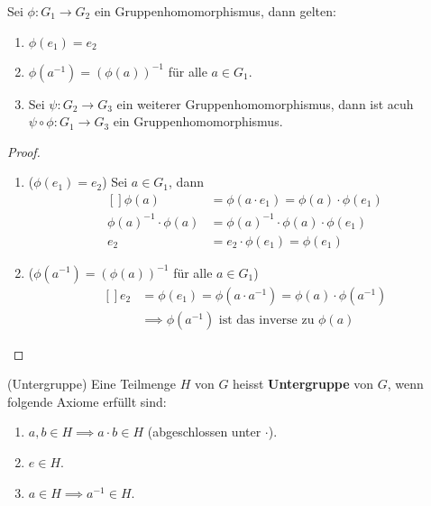 \documentclass[../Algebra_script.tex]{subfiles}
\begin{document}
\begin{proposition}
	Sei $\phi: G_1 \to G_2$ ein Gruppenhomomorphismus, dann gelten:
	\begin{enumerate}
		\item $\phi(e_1) = e_2$
		\item $\phi(a^{-1}) = (\phi(a))^{-1}$ für alle $a \in G_1$.
		\item Sei $\psi: G_2 \to G_3$ ein weiterer Gruppenhomomorphismus, dann ist acuh $\psi \circ \phi: G_1 \to G_3$ ein Gruppenhomomorphismus. 
	\end{enumerate}
\end{proposition}

\begin{proof}
\begin{enumerate}
	\item{($\phi(e_1) = e_2$)} 
		Sei $a \in G_1$, dann 
		\[\begin{aligned}[]
			\phi(a) &= \phi(a\cdot e_1) = \phi(a)\cdot \phi(e_1)\\
			\phi(a)^{-1}\cdot \phi(a) &= \phi(a)^{-1} \cdot \phi(a) \cdot \phi(e_1)\\
			e_2 &= e_2\cdot \phi(e_1) = \phi(e_1)
		\end{aligned}\] 
	\item{($\phi(a^{-1}) = (\phi(a))^{-1}$ für alle $a \in G_1$)}
		\[\begin{aligned}[]
			e_2 &= \phi(e_1) = \phi(a \cdot a^{-1}) = \phi(a)\cdot \phi(a^{-1})\\
			&\implies \phi(a^{-1}) \text{ ist das inverse zu } \phi(a)
		\end{aligned}\]
\end{enumerate}
\end{proof}

\begin{definition}{(Untergruppe)}
	Eine Teilmenge $H$ von $G$ heisst \textbf{Untergruppe} von $G$, wenn folgende Axiome erfüllt sind:
	\begin{enumerate}
		\item $a, b \in H \implies a \cdot b \in H$ (abgeschlossen unter $\cdot$).
		\item $e \in H$.
		\item $a \in H \implies a^{-1} \in H$. 
	\end{enumerate}
\end{definition}
\end{document}
